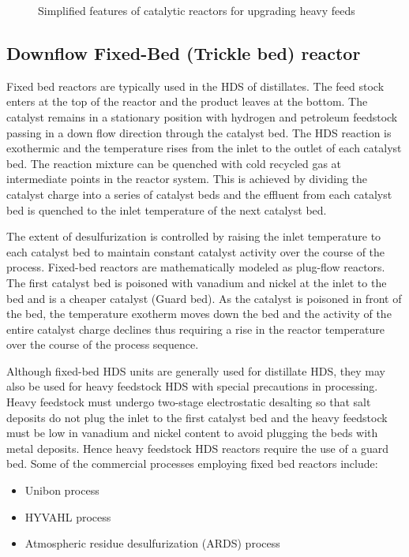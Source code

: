 \begin{figure}[htbp]
\centering
{}
\caption{Simplified features of catalytic reactors for upgrading heavy feeds \citep{tagkey2007217}}
\label{fig:hdsreactors}
\end{figure}

\subsection{Downflow Fixed-Bed (Trickle bed) reactor}

Fixed bed reactors are typically used in the HDS of distillates. The feed stock enters at the top of the reactor and the product leaves at the bottom. The catalyst remains in a stationary position with hydrogen and petroleum feedstock passing in a down flow direction through the catalyst bed. The HDS reaction is exothermic and the temperature rises from the inlet to the outlet of each catalyst bed. 
The reaction mixture can be quenched with cold recycled gas at intermediate points in the reactor system. This is achieved by dividing the catalyst charge into a series of catalyst beds and the effluent from each catalyst bed is quenched to the inlet temperature of the next catalyst bed.

The extent of desulfurization is controlled by raising the inlet temperature to each catalyst bed to maintain constant catalyst activity over the course of the process. Fixed-bed reactors are mathematically modeled as plug-flow reactors. The first catalyst bed is poisoned with vanadium and nickel at the inlet to the bed and is a cheaper catalyst (Guard bed). As the catalyst is poisoned in front of the bed, the temperature exotherm moves down the bed and the activity of the entire catalyst charge declines thus requiring a rise in the reactor temperature over the course of the process sequence.

Although fixed-bed HDS units are generally used for distillate HDS, they may also be used for heavy feedstock HDS with special precautions in processing. Heavy feedstock must undergo two-stage electrostatic desalting so that salt deposits do not plug the inlet to the first catalyst bed and the heavy feedstock must be low in vanadium and nickel content to avoid plugging the beds with metal deposits. Hence heavy feedstock HDS reactors require the use of a guard bed. Some of the commercial processes employing fixed bed reactors include:
\begin{itemize}
\item Unibon process
\item HYVAHL process
\item Atmospheric residue desulfurization (ARDS) process
\end{itemize}

